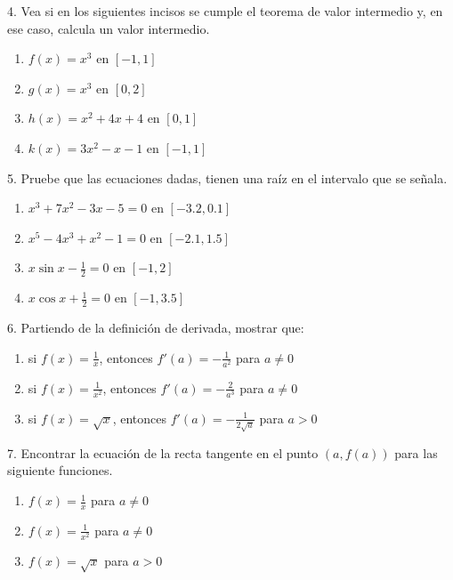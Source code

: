 \documentclass[12pt]{article}
\begin{document}
4. Vea si en los siguientes incisos se cumple el teorema de valor intermedio y, en ese caso, calcula un valor intermedio.

\begin{enumerate}[\hspace{12px} a)]
    \item \(f(x)=x^3\) en $[-1,1]$
    \item \(g(x)=x^3\) en $[0,2]$
    \item \(h(x)=x^2+4x+4\) en $[0,1]$
    \item \(k(x)=3x^2-x-1\) en $[-1,1]$
\end{enumerate}

5. Pruebe que las ecuaciones dadas, tienen una raíz en el intervalo que se señala.

\begin{enumerate}[\hspace{12px} a)]
    \item \(x^3+7x^2-3x-5=0\) en $[-3.2,0.1]$
    \item \(x^5-4x^3+x^2-1=0\) en $[-2.1,1.5]$
    \item \(x\sin x-\displaystyle\frac{1}{2}=0\) en $[-1,2]$
    \item \(x\cos x+\displaystyle\frac{1}{2}=0\) en $[-1,3.5]$
\end{enumerate}

6. Partiendo de la definición de derivada, mostrar que:

\begin{enumerate}[\hspace{12px} a)]
    \item si \(f(x)=\displaystyle\frac{1}{x}\), entonces \(f'(a)=-\displaystyle\frac{1}{a^2}\) para \(a \neq 0\)
    \item si \(f(x)=\displaystyle\frac{1}{x^2}\), entonces \(f'(a)=-\displaystyle\frac{2}{a^3}\) para \(a \neq 0\)
    \item si \(f(x)=\sqrt{x}\), entonces \(f'(a)=-\displaystyle\frac{1}{2\sqrt{a}}\) para \(a > 0\)
\end{enumerate}

7. Encontrar la ecuación de la recta tangente en el punto \((a,f(a))\) para las siguiente funciones.

\begin{enumerate}[\hspace{12px} a)]
    \item \(f(x)=\displaystyle\frac{1}{x}\) para \(a \neq 0\)
    \item \(f(x)=\displaystyle\frac{1}{x^2}\) para \(a \neq 0\)
    \item \(f(x)=\sqrt{x}\) para \(a > 0\)
\end{enumerate}
\end{document}

